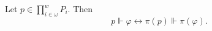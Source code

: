 Let $p \in \prod_{i \in \omega}^{w} P_i$. Then
$$p \Vdash \varphi \leftrightarrow \pi(p) \Vdash \pi(\varphi).$$
